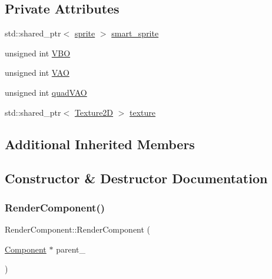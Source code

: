 \subsection*{Private Attributes}
\begin{DoxyCompactItemize}
\item 
std\+::shared\+\_\+ptr$<$ \hyperlink{classsprite}{sprite} $>$ \hyperlink{classRenderComponent_a5957b320510f0ab746614f9d31765c69}{smart\+\_\+sprite}
\item 
unsigned int \hyperlink{classRenderComponent_a82809c0d1c00bb0bc413cac2b43b9798}{V\+BO}
\item 
unsigned int \hyperlink{classRenderComponent_ada9411b5bec58bd87311579cb93b85ea}{V\+AO}
\item 
unsigned int \hyperlink{classRenderComponent_ae10a802c26234ac9f665bac4d626d41f}{quad\+V\+AO}
\item 
std\+::shared\+\_\+ptr$<$ \hyperlink{classTexture2D}{Texture2D} $>$ \hyperlink{classRenderComponent_a3c6e7ef44a96bdeda2e2a49514a0d3e8}{texture}
\end{DoxyCompactItemize}
\subsection*{Additional Inherited Members}


\subsection{Constructor \& Destructor Documentation}
\mbox{\label{classRenderComponent_a24b1eded43130d0dcb0bb7e4796983c3}} 
\subsubsection{\texorpdfstring{Render\+Component()}{RenderComponent()}}
{\footnotesize\ttfamily Render\+Component\+::\+Render\+Component (\begin{DoxyParamCaption}\item[{\hyperlink{classComponent}{Component} $\ast$}]{parent\+\_\+ }\end{DoxyParamCaption})}

\mbox{\label{classRenderComponent_a16bab40295123b9ea802d7e85b14a884}} 
